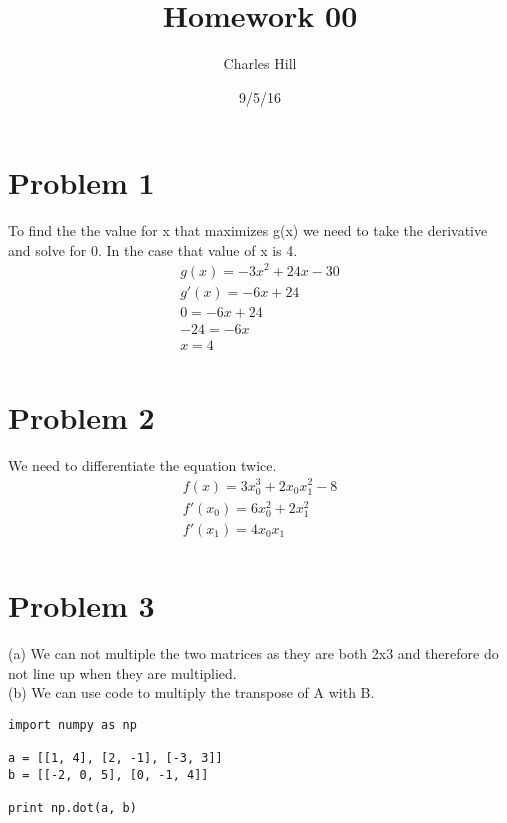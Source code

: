 \documentclass[a4paper]{article}
\title{Homework 00}
\author{Charles Hill}
\date{9/5/16}
\begin{document}
\lstset{language=Python}

\maketitle

\section{Problem 1}
To find the the value for x that maximizes g(x) we need to take the derivative and solve for 0. In the case that value of x is 4.
\begin{equation}
\begin{align}
  g(x) = -3x^{2} + 24x - 30 \\
	g'(x) = -6x +24 \\
	0 = -6x + 24 \\
	-24 = -6x \\
	x = 4 \\
\end{align}	
\end{equation}

\section{Problem 2}
We need to differentiate the equation twice. 
\begin{equation}
\begin{align}
  f(x) = 3x_{0}^{3} + 2x_{0}x_{1}^{2} - 8 \\
	f'(x_{0}) = 6x_{0}^{2} + 2x_{1}^{2} \\
	f'(x_{1}) = 4x_{0}x_{1}\\
\end{align}	
\end{equation}

\section{Problem 3}
(a) We can not multiple the two matrices as they are both 2x3 and therefore do not line up when they are multiplied. \\
(b) We can use code to multiply the transpose of A with B. \\

\begin{lstlisting}[frame=single]
import numpy as np

a = [[1, 4], [2, -1], [-3, 3]]
b = [[-2, 0, 5], [0, -1, 4]]

print np.dot(a, b)
\end{lstlisting}
\end{document}
